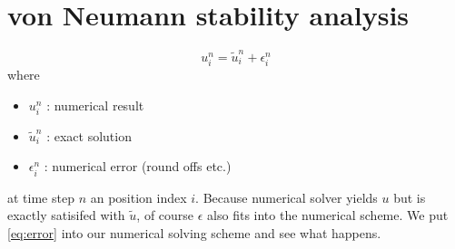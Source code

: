 \section{von Neumann stability analysis}

\begin{equation}
  u_i^n = \tilde{u}_i^n + \epsilon_i^n
  \label{eq:error}
\end{equation}
where
\begin{itemize}
  \item $u_i^n$ : numerical result
  \item $\tilde{u}_i^n$ : exact solution
  \item $\epsilon_i^n$ : numerical error (round offs etc.)
\end{itemize}
at time step $n$ an position index $i$.
Because numerical solver yields $u$ but is exactly satisifed with $\tilde{u}$, of course $\epsilon$ also fits into the numerical scheme.
We put \ref{eq:error} into our numerical solving scheme and see what happens.

